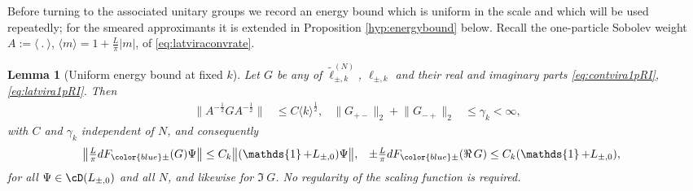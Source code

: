 \documentclass[a4paper, 11pt]{article}
\DeclareMathOperator{\1}{\mathds{1}}
\newtheorem{lemma}[thm]{Lemma}
\begin{document}
Before turning to the associated unitary groups we record an energy bound which is uniform in the scale and which will be used repeatedly; for the smeared approximants it is extended in Proposition \ref{hyp:energybound} below. Recall the one-particle Sobolev weight $A:=\langle\!\ .\!\ \rangle$, $\langle m\rangle = 1+\tfrac{L}{\pi}|m|$, of \eqref{eq:latviraconvrate}.

\begin{lemma}[Uniform energy bound at fixed $k$]
\label{lem:energybound1k}
Let $G$ be any of $\tilde{\ell}^{(N)}_{\pm,k}$, $\ell_{\pm,k}$ and their real and imaginary parts \eqref{eq:contvira1pRI}, \eqref{eq:latvira1pRI}. Then
\begin{align}
\label{eq:relbound1k}
\big\|A^{-\frac{1}{2}}GA^{-\frac{1}{2}}\big\| & \leq C\langle k\rangle^{\frac{1}{2}}, & \big\|G_{+-}\big\|_{2}+\big\|G_{-+}\big\|_{2} & \leq \gamma_{k} < \infty,
\end{align}
with $C$ and $\gamma_{k}$ independent of $N$, and consequently
\begin{align}
\label{eq:energybound1k}
\big\|\tfrac{L}{\pi}dF_{{\color{blue}\pm}}(G)\Psi\big\| & \leq C_{k}\big\|(\1+L_{\pm,0})\Psi\big\|, & \pm\tfrac{L}{\pi}dF_{{\color{blue}\pm}}(\Re\!\ G) & \leq C_{k}(\1+L_{\pm,0}),
\end{align}
for all $\Psi\in\cD(L_{\pm,0})$ and all $N$, and likewise for $\Im\!\ G$. No regularity of the scaling function is required.
\end{lemma}
\end{document}
